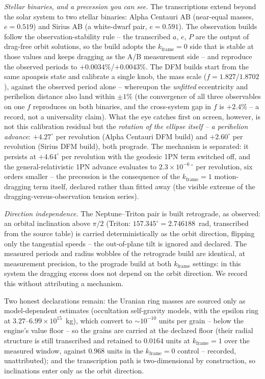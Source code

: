 \documentclass[aps,reprint,amsmath,amssymb,nofootinbib,superscriptaddress,floatfix]{revtex4-2}
\begin{document}
\emph{Stellar binaries, and a precession you can see.} The
transcriptions extend beyond the solar system to two stellar binaries:
Alpha Centauri AB (near-equal masses, $e=0.519$) and Sirius AB (a
white-dwarf pair, $e=0.591$). The observation builds follow the
observation-stability rule -- the transcribed $a$, $e$, $P$ are the
output of drag-free orbit solutions, so the build adopts the
$k_{\mathrm{frame}}=0$ side that is stable at those values and keeps
dragging as the A/B measurement side -- and reproduce the observed
periods to $+0.0034\%$/$+0.0043\%$. The DFM builds start from the same
apoapsis state and calibrate a single knob, the mass scale
($f=1.827$/$1.8702$), against the observed period alone -- whereupon the
\emph{unfitted} eccentricity and perihelion distance also land within
$\pm1\%$ (the convergence of all three observables on one $f$
reproduces on both binaries, and the cross-system gap in $f$ is
$+2.4\%$ -- a record, not a universality claim). What the eye catches
first on screen, however, is not this calibration residual but the
\emph{rotation of the ellipse itself -- a perihelion advance}:
$+4.27^{\circ}$ per revolution (Alpha Centauri DFM build) and
$+2.60^{\circ}$ per revolution (Sirius DFM build), both prograde. The
mechanism is separated: it persists at $+4.64^{\circ}$ per revolution
with the geodesic 1PN term switched off, and the general-relativistic
1PN advance evaluates to $2.3\times10^{-6}\,{}^{\circ}$ per revolution,
six orders smaller -- the precession is the consequence of the
$k_{\mathrm{frame}}=1$ motion-dragging term itself, declared rather
than fitted away (the visible extreme of the dragging-versus-observation
tension series).

\emph{Direction independence.} The Neptune--Triton pair is built
retrograde, as observed: an orbital inclination above $\pi/2$
(Triton: $157.345^{\circ} = 2.746188$~rad, transcribed from the source
table) is carried deterministically as the orbit direction, flipping
only the tangential speeds -- the out-of-plane tilt is ignored and
declared. The measured periods and radius wobbles of the retrograde
build are identical, at measurement precision, to the prograde build at
both $k_{\mathrm{frame}}$ settings: in this system the dragging excess
does not depend on the orbit direction. We record this without
attributing a mechanism.

Two honest declarations remain: the Uranian ring masses are sourced
only as model-dependent estimates (occultation self-gravity models,
with the epsilon ring at $3.27$--$6.99\times10^{15}$~kg), which convert
to ${\sim}10^{-10}$ units per grain -- below the engine's value floor --
so the grains are carried at the declared floor (their radial structure is
still transcribed and retained to $0.0164$ units at
$k_{\mathrm{frame}}=1$ over the measured window, against $0.968$ units
in the $k_{\mathrm{frame}}=0$ control -- recorded, unattributed); and
the transcription path is two-dimensional by construction, so
inclinations enter only as the orbit direction.
\end{document}
